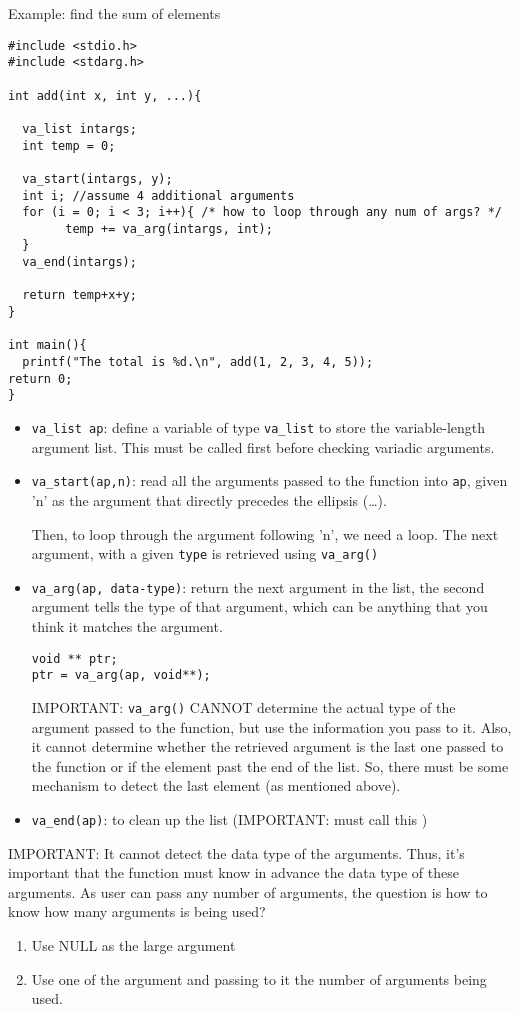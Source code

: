 Example: find the sum of elements
{\small \begin{verbatim}  
#include <stdio.h>
#include <stdarg.h>

int add(int x, int y, ...){

  va_list intargs;
  int temp = 0;

  va_start(intargs, y);
  int i; //assume 4 additional arguments
  for (i = 0; i < 3; i++){ /* how to loop through any num of args? */ 
        temp += va_arg(intargs, int);
  }
  va_end(intargs);

  return temp+x+y;
} 

int main(){
  printf("The total is %d.\n", add(1, 2, 3, 4, 5));
return 0;
}
\end{verbatim}}

\begin{itemize}
  \item \verb!va_list ap!: define a variable of type \verb!va_list! to store the
  variable-length argument list. This must be called first before checking
  variadic arguments.
  \item \verb!va_start(ap,n)!: read all the arguments passed to the function
  into \verb!ap!, given 'n' as the argument that directly precedes the ellipsis
  (\ldots).
  
  Then, to loop through the argument following 'n', we need a loop. The next
  argument, with a given \verb!type! is retrieved using \verb!va_arg()!
  
  \item \verb!va_arg(ap, data-type)!: return the next argument in the list, the
  second argument tells the type of that argument, which can be anything that
  you think it matches the argument.
  \begin{verbatim}
void ** ptr;
ptr = va_arg(ap, void**);
\end{verbatim}
 IMPORTANT: \verb!va_arg()! CANNOT determine the actual type of the argument
 passed to the function, but use the information you pass to it. Also, it cannot
 determine whether the retrieved argument is the last one passed to the
 function or if the element past the end of the list. So, there must be some
 mechanism to detect the last element (as mentioned above).

  \item \verb!va_end(ap)!: to clean up the list (IMPORTANT: must call this )
\end{itemize}

IMPORTANT: It cannot detect the data type of the arguments. Thus, it's
important that the function must know in advance the data type of these
arguments. As user can pass any number of arguments, the question is how to know
how many arguments is being used?
\begin{enumerate}
  \item Use NULL as the large argument
  \item Use one of the argument and passing to it the number of arguments being
  used.
\end{enumerate}

